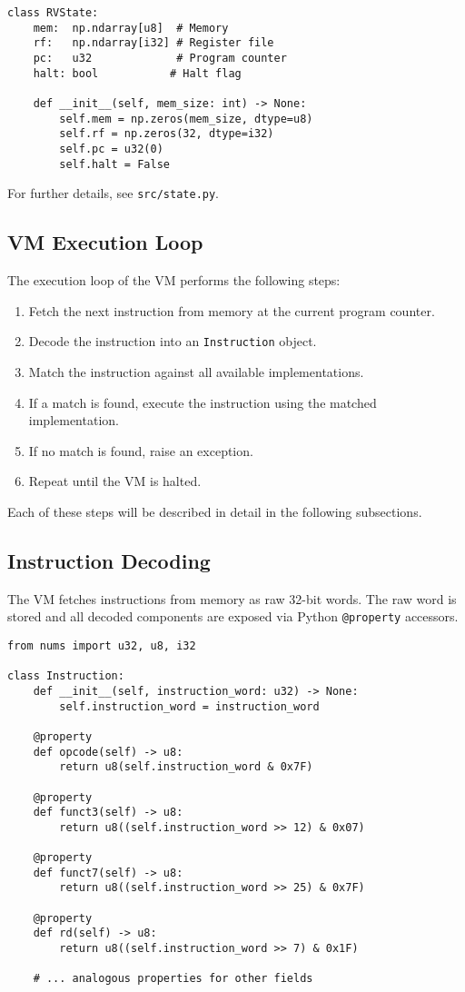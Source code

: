 \documentclass[sigconf]{acmart}
\begin{document}
\begin{verbatim}
class RVState:
    mem:  np.ndarray[u8]  # Memory
    rf:   np.ndarray[i32] # Register file
    pc:   u32             # Program counter
    halt: bool           # Halt flag

    def __init__(self, mem_size: int) -> None:
        self.mem = np.zeros(mem_size, dtype=u8)
        self.rf = np.zeros(32, dtype=i32)
        self.pc = u32(0)
        self.halt = False
\end{verbatim}
For further details, see \texttt{src/state.py}.

\subsection{VM Execution Loop}
The execution loop of the VM performs the following steps:
\begin{enumerate}
    \item Fetch the next instruction from memory at the current program counter.
    \item Decode the instruction into an \texttt{Instruction} object.
    \item Match the instruction against all available implementations.
    \item If a match is found, execute the instruction using the matched implementation.
    \item If no match is found, raise an exception.
    \item Repeat until the VM is halted.
\end{enumerate}
Each of these steps will be described in detail in the following subsections.

\subsection{Instruction Decoding}
The VM fetches instructions from memory as raw 32-bit words. The raw word is stored and all decoded components are exposed via Python \texttt{@property} accessors.

\begin{verbatim}
from nums import u32, u8, i32

class Instruction:
    def __init__(self, instruction_word: u32) -> None:
        self.instruction_word = instruction_word

    @property
    def opcode(self) -> u8:
        return u8(self.instruction_word & 0x7F)

    @property
    def funct3(self) -> u8:
        return u8((self.instruction_word >> 12) & 0x07)

    @property
    def funct7(self) -> u8:
        return u8((self.instruction_word >> 25) & 0x7F)

    @property
    def rd(self) -> u8:
        return u8((self.instruction_word >> 7) & 0x1F)

    # ... analogous properties for other fields
\end{verbatim}
\end{document}
